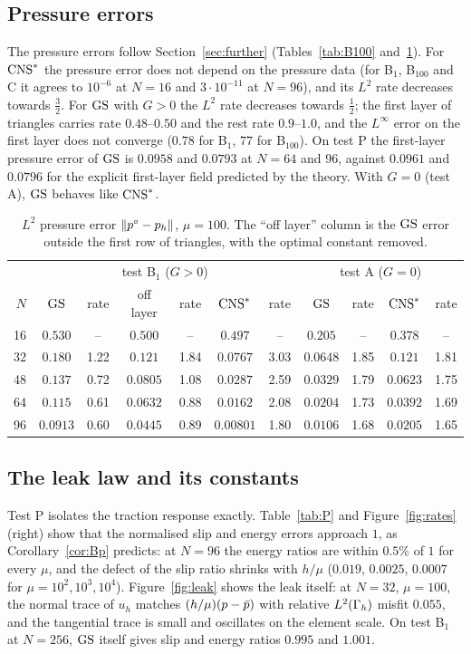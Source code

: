 \subsection{Pressure errors}
The pressure errors follow Section~\ref{sec:further} (Tables~\ref{tab:B100} and~\ref{tab:pB1}). For $\mathrm{CNS}^\ast$ the pressure error does not depend on the pressure data (for B$_1$, B$_{100}$ and C it agrees to $10^{-6}$ at $N=16$ and $3\cdot10^{-11}$ at $N=96$), and its $L^2$ rate decreases towards $\frac32$. For $\mathrm{GS}$ with $G>0$ the $L^2$ rate decreases towards $\frac12$; the first layer of triangles carries rate $0.48$--$0.50$ and the rest rate $0.9$--$1.0$, and the $L^\infty$ error on the first layer does not converge ($0.78$ for B$_1$, $77$ for B$_{100}$). On test P the first-layer pressure error of $\mathrm{GS}$ is $0.0958$ and $0.0793$ at $N=64$ and $96$, against $0.0961$ and $0.0796$ for the explicit first-layer field predicted by the theory. With $G=0$ (test A), $\mathrm{GS}$ behaves like $\mathrm{CNS}^\ast$.

\begin{table}[t]
\centering\small
\caption{$L^2$ pressure error $\lVert p^\circ-p_h\rVert$, $\mu=100$. The ``off layer'' column is the $\mathrm{GS}$ error outside the first row of triangles, with the optimal constant removed.}\label{tab:pB1}
\begin{tabular}{rcccccc|cccc}
\toprule
 & \multicolumn{6}{c|}{test B$_1$ ($G>0$)} & \multicolumn{4}{c}{test A ($G=0$)}\\
$N$ & $\mathrm{GS}$ & rate & off layer & rate & $\mathrm{CNS}^\ast$ & rate & $\mathrm{GS}$ & rate & $\mathrm{CNS}^\ast$ & rate\\
\midrule
16 & $0.530$ & -- & $0.500$ & -- & $0.497$ & -- & $0.205$ & -- & $0.378$ & --\\
32 & $0.180$ & 1.22 & $0.121$ & 1.84 & $0.0767$ & 3.03 & $0.0648$ & 1.85 & $0.121$ & 1.81\\
48 & $0.137$ & 0.72 & $0.0805$ & 1.08 & $0.0287$ & 2.59 & $0.0329$ & 1.79 & $0.0623$ & 1.75\\
64 & $0.115$ & 0.61 & $0.0632$ & 0.88 & $0.0162$ & 2.08 & $0.0204$ & 1.73 & $0.0392$ & 1.69\\
96 & $0.0913$ & 0.60 & $0.0445$ & 0.89 & $0.00801$ & 1.80 & $0.0106$ & 1.68 & $0.0205$ & 1.65\\
\bottomrule
\end{tabular}
\end{table}

\subsection{The leak law and its constants}
Test P isolates the traction response exactly. Table~\ref{tab:P} and Figure~\ref{fig:rates} (right) show that the normalised slip and energy errors approach $1$, as Corollary~\ref{cor:Bp} predicts: at $N=96$ the energy ratios are within $0.5\%$ of $1$ for every $\mu$, and the defect of the slip ratio shrinks with $h/\mu$ ($0.019$, $0.0025$, $0.0007$ for $\mu=10^2,10^3,10^4$). Figure~\ref{fig:leak} shows the leak itself: at $N=32$, $\mu=100$, the normal trace of $u_h$ matches $(h/\mu)(p-\bar p)$ with relative $L^2(\Gamma_h)$ misfit $0.055$, and the tangential trace is small and oscillates on the element scale. On test B$_1$ at $N=256$, $\mathrm{GS}$ itself gives slip and energy ratios $0.995$ and $1.001$.

